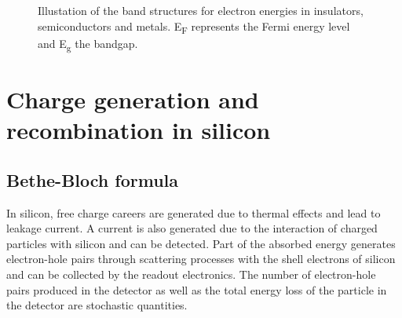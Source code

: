 \begin{figure}[htbp]
  \centering
  \caption{Illustation of the band structures for electron energies in
  insulators, semiconductors and metals. E\textsubscript{F} represents the Fermi energy level and E\textsubscript{g} the bandgap.}  
  \label{fig:energyBands}
\end{figure}

\section{Charge generation and recombination in silicon}\label{sec:chargeInSi}

\subsection{Bethe-Bloch formula}
In silicon, free charge careers are generated due to thermal effects
and lead to leakage current. A current is also generated due to the
interaction of charged particles with silicon and can be
detected. Part of the absorbed energy generates electron-hole pairs
through scattering processes with the shell electrons of silicon and
can be collected by the readout electronics. The number of
electron-hole pairs produced in the detector as well as the total
energy loss of the particle in the detector are stochastic quantities.

